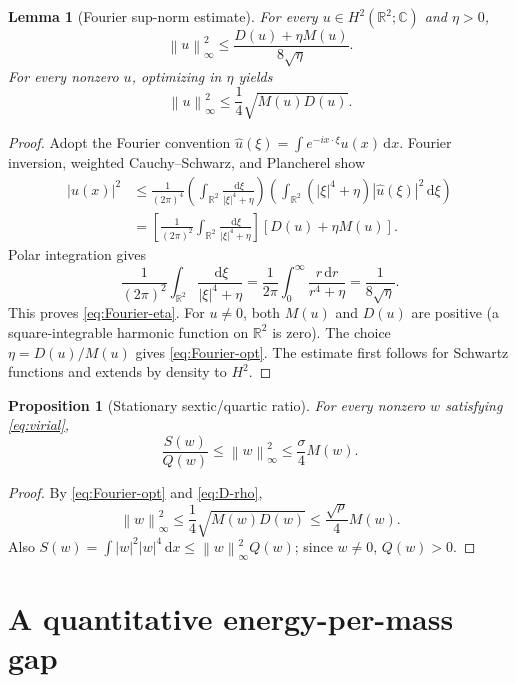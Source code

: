 \documentclass[11pt,letterpaper]{article}
\numberwithin{equation}{section}
\newtheorem{lemma}[theorem]{Lemma}
\newtheorem{proposition}[theorem]{Proposition}
\newcommand{\RR}{\mathbb R}
\newcommand{\CC}{\mathbb C}
\newcommand{\norm}[1]{\left\lVert #1\right\rVert}
\newcommand{\abs}[1]{\left\lvert #1\right\rvert}
\newcommand{\dd}{\,\mathrm d}
\begin{document}
\begin{lemma}[Fourier sup-norm estimate]\label{lem:Fourier}
For every $u\in H^2(\RR^2;\CC)$ and $\eta>0$,
\begin{equation}\label{eq:Fourier-eta}
 \norm{u}_\infty^2\le\frac{D(u)+\eta M(u)}{8\sqrt\eta}.
\end{equation}
For every nonzero $u$, optimizing in $\eta$ yields
\begin{equation}\label{eq:Fourier-opt}
 \boxed{\ \norm{u}_\infty^2\le\frac14\sqrt{M(u)D(u)}.\ }
\end{equation}
\end{lemma}
\begin{proof}
Adopt the Fourier convention $\widehat u(\xi)=\int e^{-ix\cdot\xi}u(x)\dd x$. Fourier inversion, weighted Cauchy--Schwarz, and Plancherel show
\[
 \begin{aligned}
 \abs{u(x)}^2
 &\le\frac{1}{(2\pi)^4}
 \left(\int_{\RR^2}\frac{\dd\xi}{\abs\xi^4+\eta}\right)
 \left(\int_{\RR^2}(\abs\xi^4+\eta)\abs{\widehat u(\xi)}^2\dd\xi\right)\\
 &=\left[\frac{1}{(2\pi)^2}
 \int_{\RR^2}\frac{\dd\xi}{\abs\xi^4+\eta}\right]
 [D(u)+\eta M(u)].
 \end{aligned}
\]
Polar integration gives
\[
 \frac{1}{(2\pi)^2}\int_{\RR^2}
 \frac{\dd\xi}{\abs\xi^4+\eta}
 =\frac{1}{2\pi}\int_0^\infty\frac{r\dd r}{r^4+\eta}
 =\frac{1}{8\sqrt\eta}.
\]
This proves \eqref{eq:Fourier-eta}. For $u\ne0$, both $M(u)$ and $D(u)$ are positive (a square-integrable harmonic function on $\RR^2$ is zero). The choice $\eta=D(u)/M(u)$ gives \eqref{eq:Fourier-opt}. The estimate first follows for Schwartz functions and extends by density to $H^2$.
\end{proof}

\begin{proposition}[Stationary sextic/quartic ratio]\label{prop:SQ}
For every nonzero $w$ satisfying \eqref{eq:virial},
\begin{equation}\label{eq:SQ}
 \boxed{\ \frac{S(w)}{Q(w)}\le\norm{w}_\infty^2
       \le\frac\sigma4 M(w).\ }
\end{equation}
\end{proposition}
\begin{proof}
By \eqref{eq:Fourier-opt} and \eqref{eq:D-rho},
\[
 \norm{w}_\infty^2\le\frac14\sqrt{M(w)D(w)}
 \le\frac{\sqrt\rho}{4}M(w).
\]
Also $S(w)=\int\abs{w}^2\abs{w}^4\dd x\le\norm w_\infty^2Q(w)$; since $w\ne0$, $Q(w)>0$.
\end{proof}

\section{A quantitative energy-per-mass gap}
\end{document}
